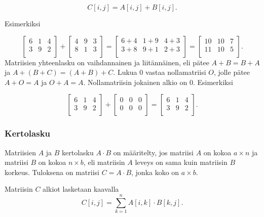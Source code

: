 \[ C[i,j]=A[i,j]+B[i,j]. \]

Esimerkiksi

\[
 \begin{bmatrix}
  6 & 1 & 4 \\
  3 & 9 & 2 \\
 \end{bmatrix}
+
 \begin{bmatrix}
  4 & 9 & 3 \\
  8 & 1 & 3 \\
 \end{bmatrix}
=
 \begin{bmatrix}
  6+4 & 1+9 & 4+3 \\
  3+8 & 9+1 & 2+3 \\
 \end{bmatrix}
=
 \begin{bmatrix}
  10 & 10 & 7 \\
  11 & 10 & 5 \\
 \end{bmatrix}.
\]
Matriisien yhteenlasku on vaihdannainen ja liitännäinen,
eli pätee $A+B=B+A$ ja $A+(B+C)=(A+B)+C$.
Lukua 0 vastaa nollamatriisi $O$,
jolle pätee $A+O=A$ ja $O+A=A$.
Nollamatriisin jokainen alkio on 0.
Esimerkiksi

\[
 \begin{bmatrix}
  6 & 1 & 4 \\
  3 & 9 & 2 \\
 \end{bmatrix}
+
 \begin{bmatrix}
  0 & 0 & 0 \\
  0 & 0 & 0 \\
 \end{bmatrix}
=
 \begin{bmatrix}
  6 & 1 & 4 \\
  3 & 9 & 2 \\
 \end{bmatrix}.
\]

\subsubsection{Kertolasku}

Matriisien $A$ ja $B$ kertolasku $A \cdot B$ on määritelty,
jos matriisi $A$ on kokoa $a \times n$
ja matriisi $B$ on kokoa $n \times b$,
eli matriisin $A$ leveys on sama kuin matriisin
$B$ korkeus.
Tuloksena on matriisi $C=A \cdot B$,
jonka koko on $a \times b$.

Matriisin $C$ alkiot lasketaan kaavalla
\[
C[i,j] = \sum_{k=1}^n A[i,k] \cdot B[k,j].
\]

